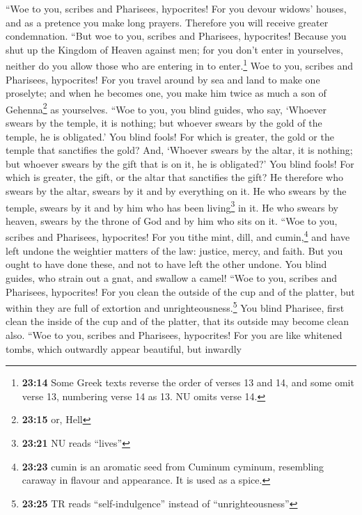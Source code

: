  ``Woe to you, scribes and Pharisees, hypocrites! For you
devour widows' houses, and as a pretence you make long prayers.
Therefore you will receive greater condemnation.  ``But
woe to you, scribes and Pharisees, hypocrites! Because you shut up the
Kingdom of Heaven against men; for you don't enter in yourselves,
neither do you allow those who are entering in to enter.\footnote{\textbf{23:14}
  Some Greek texts reverse the order of verses 13 and 14, and some omit
  verse 13, numbering verse 14 as 13. NU omits verse 14.}
 Woe to you, scribes and Pharisees, hypocrites! For you
travel around by sea and land to make one proselyte; and when he becomes
one, you make him twice as much a son of Gehenna\footnote{\textbf{23:15}
  or, Hell} as yourselves.  ``Woe to you, you blind
guides, who say, `Whoever swears by the temple, it is nothing; but
whoever swears by the gold of the temple, he is obligated.'
 You blind fools! For which is greater, the gold or the
temple that sanctifies the gold?  And, `Whoever swears by
the altar, it is nothing; but whoever swears by the gift that is on it,
he is obligated?'  You blind fools! For which is greater,
the gift, or the altar that sanctifies the gift?  He
therefore who swears by the altar, swears by it and by everything on it.
 He who swears by the temple, swears by it and by him who
has been living\footnote{\textbf{23:21} NU reads ``lives''} in it.
 He who swears by heaven, swears by the throne of God and
by him who sits on it.  ``Woe to you, scribes and
Pharisees, hypocrites! For you tithe mint, dill, and cumin,\footnote{\textbf{23:23}
  cumin is an aromatic seed from Cuminum cyminum, resembling caraway in
  flavour and appearance. It is used as a spice.} and have left undone
the weightier matters of the law: justice, mercy, and faith. But you
ought to have done these, and not to have left the other undone.
 You blind guides, who strain out a gnat, and swallow a
camel!  ``Woe to you, scribes and Pharisees, hypocrites!
For you clean the outside of the cup and of the platter, but within they
are full of extortion and unrighteousness.\footnote{\textbf{23:25} TR
  reads ``self-indulgence'' instead of ``unrighteousness''}
 You blind Pharisee, first clean the inside of the cup
and of the platter, that its outside may become clean also.
 ``Woe to you, scribes and Pharisees, hypocrites! For you
are like whitened tombs, which outwardly appear beautiful, but inwardly
